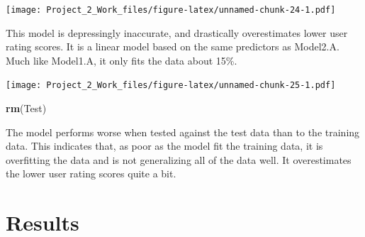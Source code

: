 \documentclass[]{article}
\newenvironment{Shaded}{\begin{snugshade}}{\end{snugshade}}
\newcommand{\KeywordTok}[1]{\textcolor[rgb]{0.13,0.29,0.53}{\textbf{{#1}}}}
\newcommand{\DataTypeTok}[1]{\textcolor[rgb]{0.13,0.29,0.53}{{#1}}}
\newcommand{\DecValTok}[1]{\textcolor[rgb]{0.00,0.00,0.81}{{#1}}}
\newcommand{\StringTok}[1]{\textcolor[rgb]{0.31,0.60,0.02}{{#1}}}
\newcommand{\NormalTok}[1]{{#1}}
\begin{document}
\begin{Shaded}
\end{Shaded}

\texttt{[image: Project\_2\_Work\_files/figure-latex/unnamed-chunk-24-1.pdf]}

This model is depressingly inaccurate, and drastically overestimates
lower user rating scores. It is a linear model based on the same
predictors as Model2.A. Much like Model1.A, it only fits the data about
15\%.

\begin{Shaded}
\end{Shaded}

\texttt{[image: Project\_2\_Work\_files/figure-latex/unnamed-chunk-25-1.pdf]}

\begin{Shaded}
\begin{Highlighting}[]
\KeywordTok{rm}\NormalTok{(Test)}
\end{Highlighting}
\end{Shaded}

The model performs worse when tested against the test data than to the
training data. This indicates that, as poor as the model fit the
training data, it is overfitting the data and is not generalizing all of
the data well. It overestimates the lower user rating scores quite a
bit.

\section{Results}\label{results}
\end{document}
